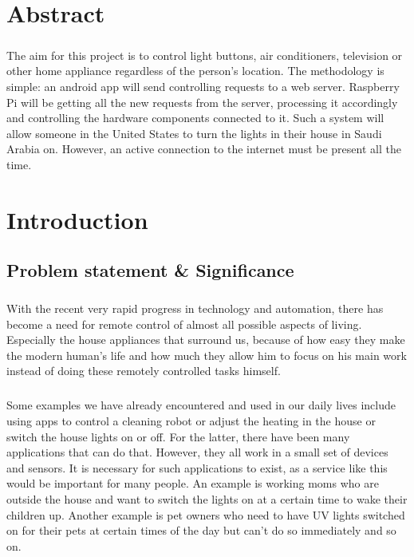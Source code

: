 \documentclass[12pt, oneside, a4paper]{book}
\newcommand{\mychapter}[1]{\newpage%
	\thispagestyle{empty}
	\topskip0pt%
	\vspace*{\fill}%
	\addtocounter{chapter}{1}%
	\begin{center}%
		\textbf{\Large{\color{chapter}{CHAPTER NO. \thechapter \\ \uppercase{#1}}}}%
	\end{center}%
	\vspace*{\fill}%
	\addtocounter{chapter}{-1}
	\newpage%
	\chapter{#1}
}
\begin{document}
	\chapter*{Abstract}
		\label{sec:intro}
		\paragraph{} The aim for this project is to control light buttons, air conditioners, television or other home appliance regardless of the person's location. The methodology is simple: an android app will send controlling requests to a web server. Raspberry Pi will be getting all the new requests from the server, processing it accordingly and controlling the hardware components connected to it. Such a system will allow someone in the United States to turn the lights in their house in Saudi Arabia on. However, an active connection to the internet must be present all the time. 
		
	

	\mychapter{Introduction}
		\section{Problem statement \& Significance}
		\paragraph{}With the recent very rapid progress in technology and automation, there has
		become a need for remote control of almost all possible aspects of living. Especially
		the house appliances that surround us, because of how easy they make the modern
		human’s life and how much they allow him to focus on his main work 
		instead of doing these remotely controlled tasks himself. 
		\paragraph{}Some examples we have already encountered and used in our daily lives include using apps to control a cleaning robot or adjust the heating in the house or switch the house lights on or off. For the latter, there have been many applications that can do that. However, they all work in a small set of devices and sensors. It is necessary for such applications to exist, as a service like this would be important for many people. An example is working moms who are outside the house and want to switch the lights on at a certain time to wake their children up. Another example is pet owners who need to have UV lights switched on for their pets at certain times of the day but can’t do so immediately and so on. 
\end{document}
